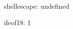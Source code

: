 shellescape: \ifx\shellescape\undefined
  undefined
\else
  \ifcase{}   \fi
\fi

ifeof18:  1  \fi

\immediate{}

\bye

